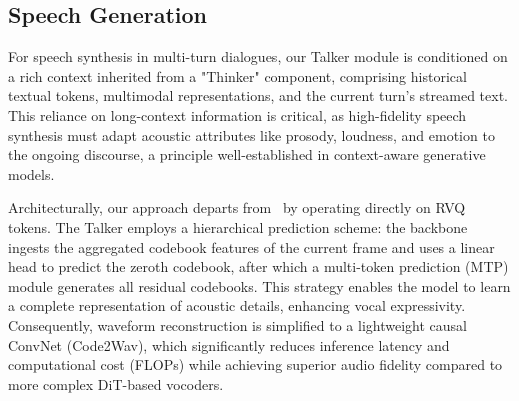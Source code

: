 \subsection{Speech Generation}


For speech synthesis in multi-turn dialogues, our Talker module is conditioned on a rich context inherited from a "Thinker" component, comprising historical textual tokens, multimodal representations, and the current turn's streamed text. This reliance on long-context information is critical, as high-fidelity speech synthesis must adapt acoustic attributes like prosody, loudness, and emotion to the ongoing discourse, a principle well-established in context-aware generative models.

Architecturally, our approach departs from~\citet{qwen2.5omni} by operating directly on RVQ tokens. The Talker employs a hierarchical prediction scheme: the backbone ingests the aggregated codebook features of the current frame and uses a linear head to predict the zeroth codebook, after which a multi-token prediction (MTP) module generates all residual codebooks. This strategy enables the model to learn a complete representation of acoustic details, enhancing vocal expressivity. Consequently, waveform reconstruction is simplified to a lightweight causal ConvNet (Code2Wav), which significantly reduces inference latency and computational cost (FLOPs) while achieving superior audio fidelity compared to more complex DiT-based vocoders.

